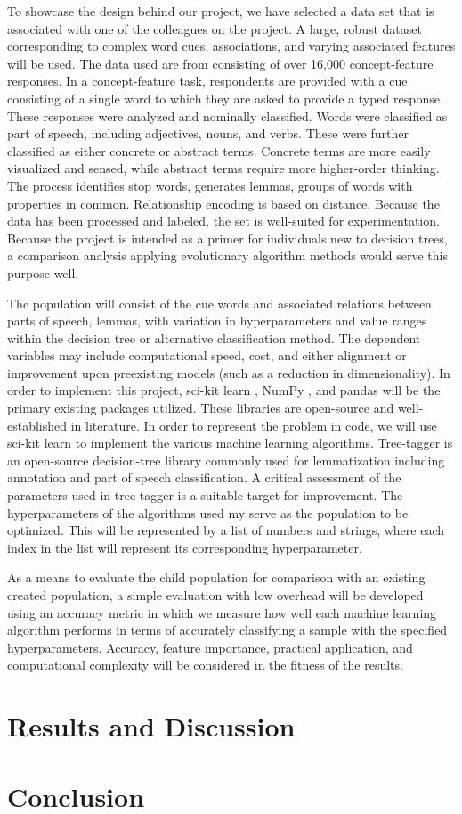 \documentclass{article}
\begin{document}
To showcase the design behind our project, we have selected a data set that is associated with one of the colleagues on the project. A large, robust dataset corresponding to complex word cues, associations, and varying associated features will be used. The data used are from \citep{buchanan_dedeyne_montefinese_2019} consisting of over 16,000 concept-feature responses. In a concept-feature task, respondents are provided with a cue consisting of a single word to which they are asked to provide a typed response. These responses were analyzed and nominally classified. Words were classified as part of speech, including adjectives, nouns, and verbs. These were further classified as either concrete or abstract terms. Concrete terms are more easily visualized and sensed, while abstract terms require more higher-order thinking. The process identifies stop words, generates lemmas, groups of words with properties in common. Relationship encoding is based on distance. Because the data has been processed and labeled, the set is well-suited for experimentation. Because the project is intended as a primer for individuals new to decision trees, a comparison analysis applying evolutionary algorithm methods would serve this purpose well.  

The population will consist of the cue words and associated relations between parts of speech, lemmas, with variation in hyperparameters and value ranges within the decision tree or alternative classification method. The dependent variables may include computational speed, cost, and either alignment or improvement upon preexisting models (such as a reduction in dimensionality). In order to implement this project, sci-kit learn \citep{pedregosa2011scikit}, NumPy \citep{oliphant2006guide}, and pandas \citep{mckinney2010data} will be the primary existing packages utilized. These libraries are open-source and well-established in literature. In order to represent the problem in code, we will use sci-kit learn to implement the various machine learning algorithms. Tree-tagger is an open-source decision-tree library commonly used for lemmatization including annotation and part of speech classification. A critical assessment of the parameters used in tree-tagger is a suitable target for improvement. The hyperparameters of the algorithms used my serve as the population to be optimized. This will be represented by a list of numbers and strings, where each index in the list will represent its corresponding hyperparameter.  

As a means to evaluate the child population for comparison with an existing created population, a simple evaluation with low overhead will be developed using an accuracy metric in which we measure how well each machine learning algorithm performs in terms of accurately classifying a sample with the specified hyperparameters. Accuracy, feature importance, practical application, and computational complexity will be considered in the fitness of the results. 



\section{Results and Discussion}

\section{Conclusion}



\end{document}
